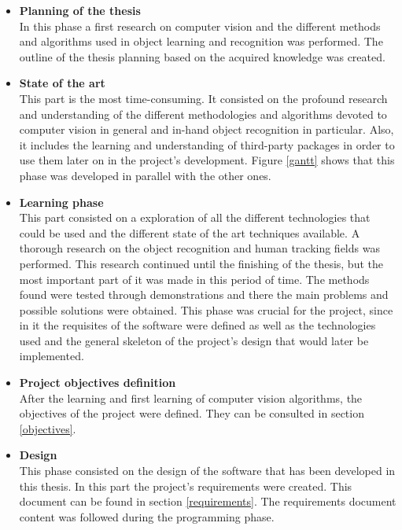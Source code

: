 		 \begin{itemize}
		 		\item{\textbf{Planning of the thesis}} \\
		 		In this phase a first research on computer vision and the different methods and algorithms used in object learning and recognition was performed. 
		 		The outline of the thesis planning based on the acquired knowledge was created. 

			 	\item{\textbf{State of the art}} \\
			 	This part is the most time-consuming.
			 	It consisted on the profound research and understanding of the different methodologies and algorithms devoted to computer vision in general and in-hand object recognition in particular. 
			 	Also, it includes the learning and understanding of third-party packages in order to use them later on in the project's development. 
			 	Figure \ref{gantt} shows that this phase was developed in parallel with the other ones. 

			 	\item{\textbf{Learning phase}} \\
			 	This part consisted on a exploration of all the different technologies that could be used and the different state of the art techniques available. A thorough research on the object recognition and human tracking fields was performed. This research continued until the finishing of the thesis, but the most important part of it was made in this period of time. 
			 	The methods found were tested through demonstrations and there the main problems and possible solutions were obtained. This phase was crucial for the project, since in it the requisites of the software were defined as well as the technologies used and the general skeleton of the project's design that would later be implemented. 
			 	\\

			 	\item{\textbf{Project objectives definition}} \\

			 	After the learning and first learning of computer vision algorithms, the objectives of the project were defined. 
			 	They can be consulted in section \ref{objectives}. 

			 	\item{\textbf{Design}} \\
			 	This phase consisted on the design of the software that has been developed in this thesis. 
			 	In this part the project's requirements were created. 
			 	This document can be found in section \ref{requirements}. 
			 	The requirements document content was followed during the programming phase. 


\end{itemize}
